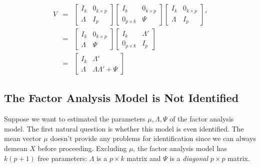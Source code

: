 \documentclass[12pt]{article}
\theoremstyle{definition}
\begin{document}
	\begin{eqnarray*}
		V &=& \left[\begin{array}{cc}
		I_k & 0_{k\times p} \\ \Lambda & I_{p}
	\end{array}\right]
\left[\begin{array}{cc}
		I_k & 0_{k\times p} \\ 0_{p\times k} & \Psi
	\end{array}\right]
	\left[\begin{array}{cc}
		I_k & 0_{k\times p} \\ \Lambda & I_{p}
	\end{array}\right]'\\
	&=& \left[ \begin{array}
		{cc} 
		I_k & 0_{k\times p}\\
		\Lambda & \Psi
	\end{array}\right]\left[\begin{array}{cc}
		I_k & \Lambda '\\
		0_{p\times k} & I_{p} 
	\end{array}\right]\\
	&=& \left[\begin{array}
		{cc}
		I_k & \Lambda' \\
		\Lambda & \Lambda \Lambda' + \Psi
	\end{array}\right]
	\end{eqnarray*}


\subsection{The Factor Analysis Model is Not Identified}
Suppose we want to estimated the parameters $\mu, \Lambda, \Psi$ of the factor analysis model. The first natural question is whether this model is even identified. The mean vector $\mu$ doesn't provide any problems for identification since we can always demean $X$ before proceeding. Excluding $\mu$, the factor analysis model has $k(p + 1)$ free parameters: $\Lambda$ is a $p\times k$ matrix and $\Psi$ is a \emph{diagonal} $p\times p$ matrix.
\end{document}
